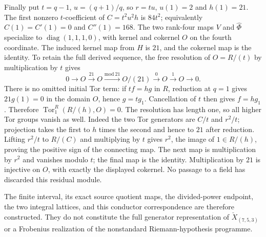 Finally put $t=q-1$, $u=(q+1)/q$, so $r=tu$, $u(1)=2$ and $h(1)=21$.
The first nonzero $t$-coefficient of $C=t^2u^2h$ is $84t^2$;
equivalently $C(1)=C'(1)=0$ and $C''(1)=168$. The two rank-four
maps $V$ and $\widehat\Phi$ specialize to
$\operatorname{diag}(1,1,1,0)$, with kernel and cokernel $O$ on
the fourth coordinate. The induced kernel map from $H$ is $21$,
and the cokernel map is the identity. To retain the full derived
sequence, the free resolution of $O=R/(t)$ by multiplication by $t$
gives
\[
 0\longrightarrow O\xrightarrow{21}O
 \xrightarrow{\mathrm{mod}\ 21}O/(21)
 \xrightarrow{0}O\xrightarrow{1}O\longrightarrow0.
\]
There is no omitted initial Tor term: if $tf=hg$ in $R$, reduction
at $q=1$ gives $21g(1)=0$ in the domain $O$, hence $g=tg_1$.
Cancellation of $t$ then gives $f=hg_1$. Therefore
$\operatorname{Tor}_1^R(R/(h),O)=0$. The resolution has length one,
so all higher Tor groups vanish as well.
Indeed the two Tor generators are $C/t$ and $r^2/t$; projection takes
the first to $h$ times the second and hence to $21$ after reduction.
Lifting $r^2/t$ to $R/(C)$ and multiplying by $t$ gives $r^2$, the
image of $1\in R/(h)$, proving the positive sign of the connecting
map. The next map is multiplication by $r^2$ and vanishes modulo
$t$; the final map is the identity. Multiplication by $21$ is injective
on $O$, with exactly the displayed cokernel. No passage to a field
has discarded this residual module.

The finite interval, its exact source quotient maps, the divided-power
endpoint, the two integral lattices, and this conductor correspondence
are therefore constructed. They do not constitute the full generator
representation of $\check X_{(7,5,3)}$ or a Frobenius realization of
the nonstandard Riemann-hypothesis programme.
